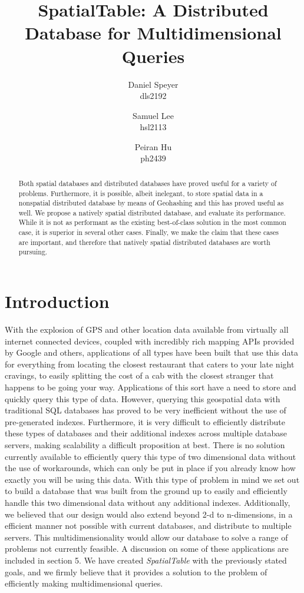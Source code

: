 \documentclass[11pt]{article}
\begin{document}
\author{Daniel Speyer\\dls2192 \and Samuel Lee\\hsl2113 \and Peiran Hu\\ph2439}
\title{SpatialTable: A Distributed Database for Multidimensional Queries}



\maketitle

\begin{abstract}
Both spatial databases and distributed databases have proved useful for a variety of problems.  Furthermore, it is possible, albeit inelegant, to store spatial data in a nonspatial distributed database by means of Geohashing and this has proved useful as well.  We propose a natively spatial distributed database, and evaluate its performance.  While it is not as performant as the existing best-of-class solution in the most common case, it is superior in several other cases.  Finally, we make the claim that these cases are important, and therefore that natively spatial distributed databases are worth pursuing.
\end{abstract}

\section{Introduction}
With the explosion of GPS and other location data available from virtually all internet connected devices, coupled with incredibly rich mapping APIs provided by Google and others, applications of all types have been built that use this data for everything from locating the closest restaurant that caters to your late night cravings, to easily splitting the cost of a cab with the closest stranger that happens to be going your way. Applications of this sort have a need to store and quickly query this type of data. However, querying this geospatial data with traditional SQL databases has proved to be very inefficient without the use of pre-generated indexes. Furthermore, it is very difficult to efficiently distribute these types of databases and their additional indexes across multiple database servers, making scalability a difficult proposition at best. There is no solution currently available to efficiently query this type of two dimensional data without the use of workarounds, which can only be put in place if you already know how exactly you will be using this data. With this type of problem in mind we set out to build a database that was built from the ground up to easily and efficiently handle this two dimensional data without any additional indexes. Additionally, we believed that our design would also extend beyond 2-d to n-dimensions, in a efficient manner not possible with current databases, and distribute to multiple servers. This multidimensionality would allow our database to solve a range of problems not currently feasible. A discussion on some of these applications are included in section 5. We have created \textit{SpatialTable} with the previously stated goals, and we firmly believe that it provides a solution to the problem of efficiently making multidimensional queries.
\end{document}

